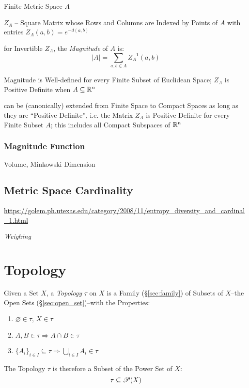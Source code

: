 Finite Metric Space $A$

$Z_A$ -- Square Matrix whose Rows and Columns are Indexed by Points of
$A$ with entries $Z_A(a,b) = e^{-d(a,b)}$

for Invertible $Z_A$, the \emph{Magnitude} of $A$ is:
\[
  |A| = \sum_{a,b \in A} Z^{-1}_A (a,b)
\]

Magnitude is Well-defined for every Finite Subset of Euclidean Space;
$Z_A$ is Positive Definite when $A \subseteq \mathbb{R}^n$

can be (canonically) extended from Finite Space to Compact Spaces as
long as they are ``Positive Definite'', i.e. the Matrix $Z_A$ is
Positive Definite for every Finite Subset $A$; this includes all
Compact Subspaces of $\mathbb{R}^n$



\subsubsection{Magnitude Function}\label{sec:magnitude_function}

Volume, Minkowski Dimension



\subsection{Metric Space Cardinality}\label{sec:metric_cardinality}

\url{https://golem.ph.utexas.edu/category/2008/11/entropy_diversity_and_cardinal_1.html}

\emph{Weighing}



\section{Topology}\label{sec:topology}

Given a Set $X$, a \emph{Topology} $\tau$ on $X$ is a Family
(\S\ref{sec:family}) of Subsets of $X$--the Open Sets
(\S\ref{sec:open_set})--with the Properties:
\begin{enumerate}
  \item $\varnothing \in \tau$, $X \in \tau$
  \item $A,B \in \tau \Rightarrow A \cap B \in \tau$
  \item $\{A_i\}_{i \in I} \subseteq \tau \Rightarrow \bigcup_{i \in
  I} A_i \in \tau$
\end{enumerate}
The Topology $\tau$ is therefore a Subset of the Power Set of $X$:
\[
  \tau \subseteq \mathscr{P}(X)
\]



